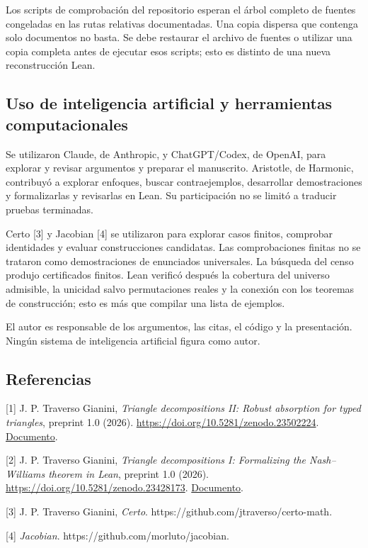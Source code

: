 \documentclass[spanish,11pt,a4paper]{article}
\begin{document}
Los scripts de comprobación del repositorio esperan el árbol completo de fuentes congeladas en las rutas relativas documentadas. Una copia dispersa que contenga solo documentos no basta. Se debe restaurar el archivo de fuentes o utilizar una copia completa antes de ejecutar esos scripts; esto es distinto de una nueva reconstrucción Lean.

\subsection{Uso de inteligencia artificial y herramientas computacionales}\label{uso-de-inteligencia-artificial-y-herramientas-computacionales}

Se utilizaron Claude, de Anthropic, y ChatGPT/Codex, de OpenAI, para explorar y revisar argumentos y preparar el manuscrito. Aristotle, de Harmonic, contribuyó a explorar enfoques, buscar contraejemplos, desarrollar demostraciones y formalizarlas y revisarlas en Lean. Su participación no se limitó a traducir pruebas terminadas.

Certo {[}3{]} y Jacobian {[}4{]} se utilizaron para explorar casos finitos, comprobar identidades y evaluar construcciones candidatas. Las comprobaciones finitas no se trataron como demostraciones de enunciados universales. La búsqueda del censo produjo certificados finitos. Lean verificó después la cobertura del universo admisible, la unicidad salvo permutaciones reales y la conexión con los teoremas de construcción; esto es más que compilar una lista de ejemplos.

El autor es responsable de los argumentos, las citas, el código y la presentación. Ningún sistema de inteligencia artificial figura como autor.


\noindent\begin{minipage}{\linewidth}
\subsection{Referencias}\label{referencias}

\begingroup\small\raggedright
\setlength{\parskip}{3pt}

{[}1{]} J. P. Traverso Gianini, \emph{Triangle decompositions II: Robust absorption for typed triangles}, preprint 1.0 (2026). \url{https://doi.org/10.5281/zenodo.23502224}. \href{https://github.com/jtraverso/nash-williams-triangle-decompositions-release/blob/main/preprints/PAPER_II/01_manuscript/PAPER_II_preprint_v1.0_es.md}{Documento}.

{[}2{]} J. P. Traverso Gianini, \emph{Triangle decompositions I: Formalizing the Nash--Williams theorem in Lean}, preprint 1.0 (2026). \url{https://doi.org/10.5281/zenodo.23428173}. \href{https://github.com/jtraverso/nash-williams-triangle-decompositions-release/blob/main/preprints/PAPER_I/01_manuscript/PAPER_I_preprint_v1.0_es.md}{Documento}.

{[}3{]} J. P. Traverso Gianini, \emph{Certo}. https://github.com/jtraverso/certo-math.

{[}4{]} \emph{Jacobian}. https://github.com/morluto/jacobian.

\endgroup

\end{minipage}
\end{document}
